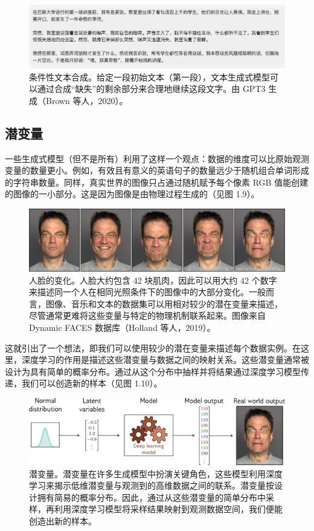 \begin{figure}
	\centering
	\includegraphics[width=0.7\linewidth]{png/chapter1/18}
	\caption{条件性文本合成。给定一段初始文本（第一段），文本生成式模型可以通过合成“缺失”的剩余部分来合理地继续这段文字。由 GPT3 生成（Brown 等人，2020）。}
\end{figure}


\subsection{潜变量}
一些生成式模型（但不是所有）利用了这样一个观点：数据的维度可以比原始观测变量的数量更小。例如，有效且有意义的英语句子的数量远少于随机组合单词形成的字符串数量。同样，真实世界的图像只占通过随机赋予每个像素 RGB 值能创建的图像的一小部分。这是因为图像是由物理过程生成的（见图 1.9）。

\begin{figure}
	\centering
	\includegraphics[width=0.7\linewidth]{png/chapter1/IntroFaceSpace}
	\caption{人脸的变化。人脸大约包含 42 块肌肉，因此可以用大约 42 个数字来描述同一个人在相同光照条件下的图像中的大部分变化。一般而言，图像、音乐和文本的数据集可以用相对较少的潜在变量来描述，尽管通常更难将这些变量与特定的物理机制联系起来。图像来自 Dynamic FACES 数据库（Holland 等人，2019）。}
\end{figure}

这就引出了一个想法，即我们可以使用较少的潜在变量来描述每个数据实例。在这里，深度学习的作用是描述这些潜变量与数据之间的映射关系。这些潜变量通常被设计为具有简单的概率分布。通过从这个分布中抽样并将结果通过深度学习模型传递，我们可以创造新的样本（见图 1.10）。

\begin{figure}
	\centering
	\includegraphics[width=0.7\linewidth]{png/chapter1/IntroLatent}
	\caption{潜变量。潜变量在许多生成模型中扮演关键角色，这些模型利用深度学习来揭示低维潜变量与观测到的高维数据之间的联系。潜变量按设计拥有简易的概率分布。因此，通过从这些潜变量的简单分布中采样，再利用深度学习模型将采样结果映射到观测数据空间，我们便能创造出新的样本。}
\end{figure}


